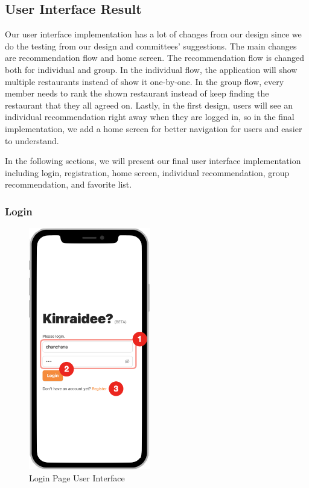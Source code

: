 \documentclass[12pt,oneside,openright,a4paper]{cpe-english-project}
\begin{document}
\subsection{User Interface Result}

Our user interface implementation has a lot of changes from our design since we do the testing from our design and committees’ suggestions. The main changes are recommendation flow and home screen. The recommendation flow is changed both for individual and group. In the individual flow, the application will show multiple restaurants instead of show it one-by-one. In the group flow, every member needs to rank the shown restaurant instead of keep finding the restaurant that they all agreed on. Lastly, in the first design, users will see an individual recommendation right away when they are logged in, so in the final implementation, we add a home screen for better navigation for users and easier to understand.

In the following sections, we will present our final user interface implementation including login, registration, home screen, individual recommendation, group recommendation, and favorite list.


\newpage
\subsubsection{Login}
\begin{figure}[H]\centering
\includegraphics[height=300pt]{./images/4ui_LoginPageUserInterface.png}
\caption{Login Page User Interface}\label{fig:4ui_LoginPageUserInterface}
\end{figure}\vspace{-24pt}
\end{document}
